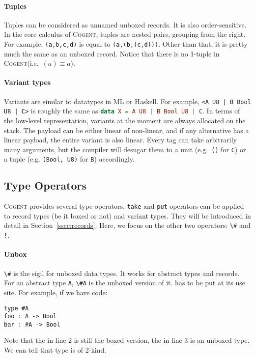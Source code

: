 \documentclass[a4paper]{article}
\newcommand{\inlinecogent}[1]{\lstinline[language=Cogent,basicstyle=\ttfamily\normalsize]{#1}\xspace}
\newcommand{\inlinehs}[1]{\lstinline[language=haskell,basicstyle=\ttfamily\normalsize]{#1}\xspace}
\newcommand{\cogent}{\textsc{Cogent}\xspace}
\begin{document}
\paragraph{Tuples} Tuples can be considered as unnamed unboxed records. It is also order-sensitive.
In the core calculus of \cogent, tuples are nested pairs, grouping from the right. For example, \inlinecogent{(a,b,c,d)} is equal to
\inlinecogent{(a,(b,(c,d)))}. Other than that, it is pretty much the same as an unboxed record. Notice that there is
no 1-tuple in \cogent (i.e.\ $(a) \equiv a$).


\paragraph{Variant types} Variants are similar to datatypes in ML or Haskell. For example,
\inlinecogent{<A U8 | B Bool U8 | C>} is roughly the same as \inlinehs{data X = A U8 | B Bool U8 | C}.
In terms of the low-level representation, variants at the moment are always allocated on the stack.
The payload can be either linear of non-linear, and if any alternative has a linear payload, the entire
variant is also linear. Every tag can take arbitrarily many arguments, but the compiler will desugar them
to a unit (e.g.\ \inlinecogent{()} for \inlinecogent{C}) or a tuple (e.g. \inlinecogent{(Bool, U8)} for \inlinecogent{B}) accordingly.


\subsection{Type Operators}
\cogent provides several type operators. \inlinecogent{take} and \inlinecogent{put} operators can be applied to
record types (be it boxed or not) and variant types. They will be introduced in detail in Section~\ref{ssec:records}.
Here, we focus on the other two operators: \inlinecogent{\#} and \inlinecogent{!}.

\paragraph{Unbox} \inlinecogent{\#} is the sigil for unboxed data types. It works for
abstract types and records. For an abstract type \inlinecogent{A}, \inlinecogent{\#A}
is the unboxed version of it. \code{\#} has to be put at its use site.
For example, if we have code:
\begin{lstlisting}[language=Cogent]
type #A
foo : A -> Bool
bar : #A -> Bool
\end{lstlisting}
Note that the  in line 2 is still the boxed version, the  in
line 3 is an unboxed type. We can tell that type  is of 2-kind.
\end{document}
